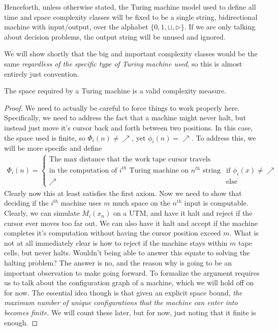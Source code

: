 \begin{center}
	Henceforth, unless otherwise stated, the Turing machine model used to define all time and space complexity classes will be fixed to be a single string, bidirectional machine with input/output, over the alphabet $\{0,1,\sqcup,\triangleright\}$. If we are only talking about decision problems, the output string will be unused and ignored.
\end{center}
We will show shortly that the big and important complexity classes would be the same \textit{regardless of the specific type of Turing machine used}, so this is almost entirely just convention.
\begin{fact}
	The space required by a Turing machine is a valid complexity measure.
\end{fact}
\begin{proof}
	We need to actually be careful to force things to work properly here. Specifically, we need to address the fact that a machine might never halt, but instead just move it's cursor back and forth between two positions. In this case, the space used is finite, so $\Phi_i(n) \neq \nearrow$, yet $\phi_i(n) = \nearrow$. To address this, we will be more specific and define
	\begin{align}
		\Phi_i(n) = \begin{cases}
						\textrm{The max distance that the work tape cursor travels} \\ \textrm{in the computation of $i^{th}$ Turing machine on $n^{th}$ string} & \textrm{if } \phi_i(x) \neq \nearrow \\
						\nearrow & \textrm{else }
					\end{cases}
	\end{align}
	Clearly now this at least satisfies the first axiom. Now we need to show that deciding if the $i^{th}$ machine uses $m$ much space on the $n^{th}$ input is computable. Clearly, we can simulate $M_i(x_n)$ on a UTM, and have it halt and reject if the cursor ever moves too far out. We can also have it halt and accept if the machine completes it's computation without having the cursor position exceed $m$. What is not at all immediately clear is how to reject if the machine stays within $m$ tape cells, but never halts. Wouldn't being able to answer this equate to solving the halting problem? The answer is no, and the reason why is going to be an important observation to make going forward. To formalize the argument requires us to talk about the configuration graph of a machine, which we will hold off on for now. The essential idea though is that given an explicit space bound, \textit{the maximum number of unique configurations that the machine can enter into becomes finite.} We will count these later, but for now, just noting that it finite is enough. 

\end{proof}
